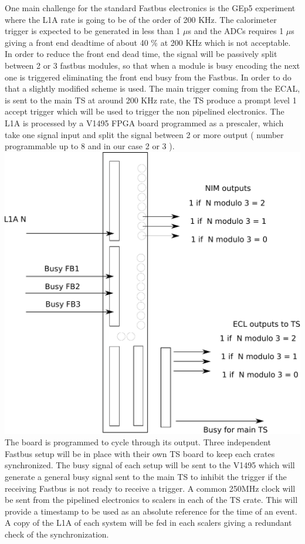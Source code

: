 \documentclass{article}
\begin{document}
One main challenge for the standard Fastbus electronics is the GEp5 experiment where the L1A rate is going to be of the order of 200 KHz. The calorimeter trigger is expected to be generated in less than 1 $\mu$s and the ADCs requires 1 $\mu$s giving a front end deadtime of about 40 \% at 200 KHz which is not acceptable. In order to reduce the front end dead time, the signal will be passively split between 2 or 3 fastbus modules, so that when a module is busy encoding the next one is triggered eliminating the front end busy from the Fastbus.
In order to do that a slightly modified scheme is used.
The main trigger coming from the ECAL, is sent to the main TS at around 200 KHz rate, the TS produce a prompt level 1 accept trigger which will be used to trigger the non pipelined electronics. The L1A is processed by a V1495 FPGA board programmed as a prescaler, which take one signal input and split the signal between 2 or more output ( number programmable up to 8 and in our case 2 or 3 ).
\includegraphics[scale=0.55]{figs/FPGAFlip.pdf}\\
The board is programmed to cycle through its output. 
Three independent Fastbus setup will be in place with their own TS board to keep each crates synchronized.
The busy signal of each setup will be sent to the V1495 which will generate a general busy signal sent to the main TS
to inhibit the trigger if the receiving Fastbus is not ready to receive a trigger. 
A common 250MHz clock will be sent from the pipelined electronics to scalers in each of the TS crate.
This will provide a timestamp to be used as an absolute reference for the time of an event.
A copy of the L1A of each system will be fed in each scalers giving a redundant check of the synchronization.
\end{document}

